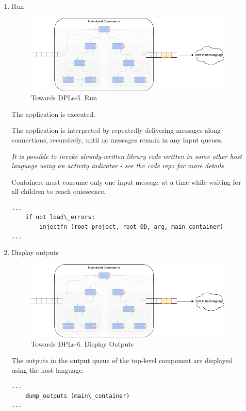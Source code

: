 \documentclass[10pt]{acmart}
\begin{document}
\begin{enumerate}
\item Run
  \begin{figure}[h]
    \centering
    \includegraphics[width=0.8\linewidth]{./media/image7.png}
    \caption{Towards DPLs-5. Run}
    \label{fig:run}
  \end{figure}
The application is executed.

The application is interpreted by repeatedly delivering messages along
connections, recursively, until no messages remain in any input queues.

\emph{It is possible to invoke already-written library code written in some other host language using an activity indicator - see the code repo for more details.}

Containers must consume only one input message at a time while waiting
for all children to reach quiescence.

\begin{verbatim}
...
    if not load\_errors:
        injectfn (root_project, root_0D, arg, main_container)
...
\end{verbatim}
  
\item Display outputs
  \begin{figure}[h]
    \centering
    \includegraphics[width=0.8\linewidth]{./media/image7.png}
    \caption{Towards DPLs-6. Display Outputs}
    \label{fig:display}
  \end{figure}

The outputs in the output queue of the top-level component are displayed
using the host language.

\begin{verbatim}
...
    dump_outputs (main\_container)
...
\end{verbatim}
  
\end{enumerate}
\end{document}
